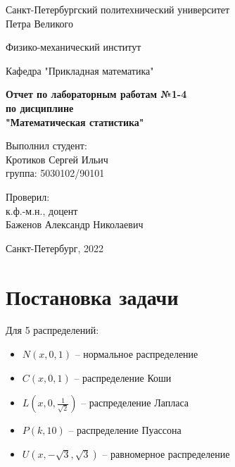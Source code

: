 \documentclass[a4paper]{article}
\begin{document}
\begin{center}
  	Санкт-Петербургский политехнический университет\\
  	Петра Великого
  	\vspace{5ex}
  	
  	Физико-механический институт 
  	\vspace{1ex}
  	
  	Кафедра "Прикладная математика"
  	\vspace{20ex}
  	
  	\textbf{Отчет по лабораторным работам №1-4 \\ 
  			по дисциплине \\
  			"Математическая статистика"}\\
  	\vspace{25ex}
\end{center}
\begin{flushright}
  	\noindent 
  	Выполнил студент: \hspace{5ex} \\
  	\vspace{0.5ex}
  	Кротиков Сергей Ильич \\
  	группа: 5030102/90101 
  	\vspace{0.5ex}
  	
  	Проверил: \\
  	\vspace{0.5ex}
  	к.ф.-м.н., доцент \\
  	Баженов Александр Николаевич
\end{flushright}
\begin{center}
  	\vfill
  	Санкт-Петербург, 2022
\end{center}
\newpage
\begin{center}
    \setcounter{page}{2}
    \tableofcontents
\end{center}
\newpage
\begin{center}
    \listoffigures
\end{center}
\newpage
\begin{center}
	\listoftables
\end{center}

\newpage

\section {Постановка задачи}
\noindent Для 5 распределений:
\begin{itemize}
	\item $N(x, 0, 1)$ -- нормальное распределение
	\item $C(x, 0, 1)$ -- распределение Коши
	\item $L(x, 0, \frac{1}{\sqrt{2}})$ -- распределение Лапласа 
	\item $P(k, 10)$ -- распределение Пуассона
	\item $U(x, -\sqrt{3}, \sqrt{3})$ -- равномерное распределение
\end{itemize}
\end{document}
